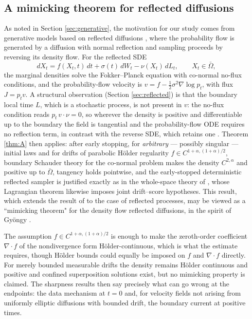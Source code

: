 \documentclass[11pt]{amsart}
\theoremstyle{definition}
\newcommand{\dive}{\nabla\!\cdot}
\begin{document}
\subsection{A mimicking theorem for reflected diffusions}

As noted in Section \ref{sec:generative}, the motivation for our study comes from generative models based on reflected diffusions \cite{LouErmon,fishman2024}, where the probability flow is generated by a diffusion 
with normal reflection \cite{LouErmon} and sampling proceeds by
reversing its density flow. For the reflected SDE
\[
dX_t = f(X_t,t)\,dt + \sigma(t)\,dW_t - \nu(X_t)\,dL_t,
\qquad X_t \in \bar\Omega ,
\]
the marginal densities solve the Fokker--Planck equation with
co-normal no-flux conditions, and the probability-flow velocity is
$v = f - \tfrac12\sigma^2\nabla\log p_t$, with flux $J = p_tv$. A
structural observation (Section \ref{sec:reflected}) is that the
boundary local time $L$, which is a stochastic process, is not present in $v$: the no-flux condition reads
$p_t\,v\cdot\nu = 0$, so wherever the density is positive and
differentiable up to the boundary the field is tangential and the probability-flow ODE
requires no reflection term, in contrast with the reverse SDE, which
retains one \cite{Cattiaux88,petit1997}. Theorem \ref{thm:A} then applies:
after early stopping, for \emph{arbitrary} --- possibly singular ---
initial laws and for drifts of parabolic H\"older regularity
$f\in C^{1+\alpha,(1+\alpha)/2}$, boundary Schauder theory for the co-normal problem
makes the density $C^{2,\alpha}$ and
positive up to $\bar\Omega$, tangency holds pointwise, and the
early-stopped deterministic reflected sampler is justified exactly
as in the whole-space theory of \cite{pfode}, whose Lagrangian
theorem likewise imposes joint drift--score hypotheses. This result, which extends the result of \cite{pfode} to the case of reflected processes,  may be viewed as a ``mimicking theorem" for the density flow reflected diffusions, in the spirit of Gy\"ongy \cite{gyongy1986}.

The assumption $f\in C^{1+\alpha,(1+\alpha)/2}$ is enough to make the
zeroth-order coefficient $\dive f$ of the nondivergence form
H\"older-continuous, which is what the estimate requires, though H\"older
bounds could equally be imposed on $f$ and $\dive f$ directly.
For merely
bounded measurable drifts the density remains H\"older continuous
and positive and confined superposition solutions exist, but no
mimicking property is claimed. The sharpness results then
say precisely what can go wrong at the endpoints: the data mechanism
at $t = 0$ and, for velocity fields not arising from
uniformly elliptic diffusions with bounded drift, the boundary
current at positive times.
\end{document}
